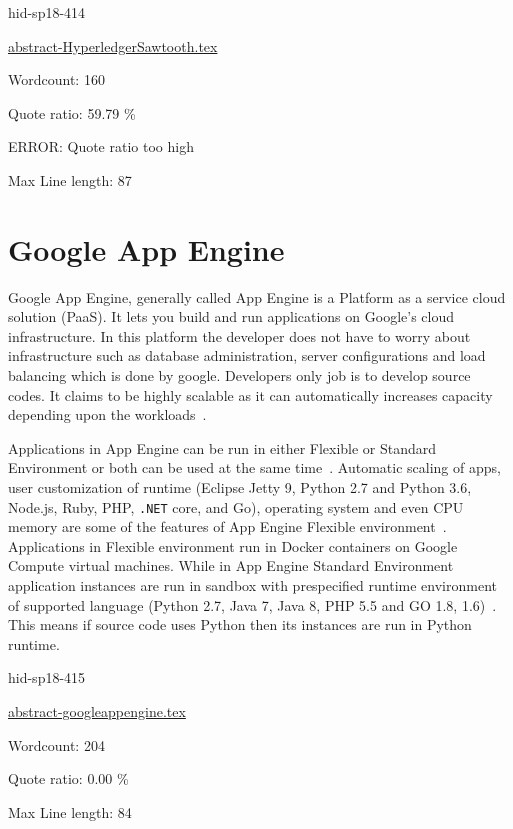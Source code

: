 \begin{IU}

hid-sp18-414

\href{https://github.com/cloudmesh-community/hid-sp18-414/blob/master//technology/abstract-HyperledgerSawtooth.tex}{abstract-HyperledgerSawtooth.tex}

 

Wordcount: 160


Quote ratio: 59.79 \%

ERROR: Quote ratio too high
 
Max Line length: 87
\end{IU}

\section{Google App Engine}

Google App Engine, generally called App Engine is a Platform as a service cloud 
solution (PaaS). It lets you build and run applications on Google's cloud 
infrastructure. In this platform the developer does not have to worry about 
infrastructure such as database administration, server configurations and 
load balancing which is done by google. Developers only job is to develop 
source codes.  It claims to be highly scalable as it can automatically 
increases capacity depending upon the
workloads~\cite{hid-sp18-415-www-scalabitity}.
 
Applications in App Engine can be run in either Flexible or Standard Environment or 
both can be used at the same time~\cite{hid-sp18-415-www-cloud-goggle}. 
Automatic scaling of apps, user customization of runtime (Eclipse Jetty 9, 
Python 2.7 and Python 3.6, Node.js, Ruby, PHP, \verb|.NET| core, and Go), operating 
system and even CPU memory  are some of the features of App Engine Flexible 
environment~\cite{hid-sp18-415-www-cloud-goggle}. Applications in Flexible 
environment run in Docker containers on Google Compute virtual machines. While 
in App Engine Standard Environment application instances are run in sandbox with 
prespecified runtime environment of supported language (Python 2.7, Java 7, 
Java 8, PHP 5.5 and GO 1.8,  1.6)~\cite{hid-sp18-415-app-engine}. 
This means if source code uses Python then its instances are run in Python runtime. 


\begin{IU}

hid-sp18-415

\href{https://github.com/cloudmesh-community/hid-sp18-415/blob/master//technology/abstract-googleappengine.tex}{abstract-googleappengine.tex}

 

Wordcount: 204


Quote ratio: 0.00 \%
 
Max Line length: 84
\end{IU}

